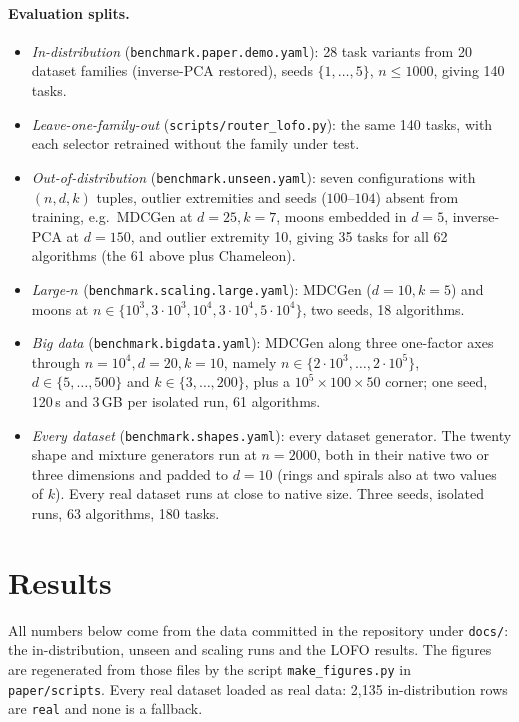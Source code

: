 \documentclass[11pt,a4paper]{article}
\newcommand{\code}[1]{\texttt{#1}}
\begin{document}
\paragraph{Evaluation splits.}
\begin{itemize}
  \item \emph{In-distribution} (\code{benchmark.paper.demo.yaml}): 28 task
  variants from 20 dataset families (inverse-PCA restored), seeds
  $\{1,\dots,5\}$, $n \le 1000$, giving 140 tasks.
  \item \emph{Leave-one-family-out} (\code{scripts/router\_lofo.py}): the same
  140 tasks, with each selector retrained without the family under test.
  \item \emph{Out-of-distribution} (\code{benchmark.unseen.yaml}): seven
  configurations with $(n, d, k)$ tuples, outlier extremities and seeds
  ($100$--$104$) absent from training, e.g.\ MDCGen at $d{=}25, k{=}7$, moons
  embedded in $d{=}5$, inverse-PCA at $d{=}150$, and outlier extremity 10,
  giving 35 tasks for all 62 algorithms (the 61 above plus Chameleon).
  \item \emph{Large-$n$} (\code{benchmark.scaling.large.yaml}): MDCGen
  ($d{=}10, k{=}5$) and moons at $n \in \{10^3, 3\cdot10^3, 10^4,
  3\cdot10^4, 5\cdot10^4\}$, two seeds, 18 algorithms.
  \item \emph{Big data} (\code{benchmark.bigdata.yaml}): MDCGen along three
  one-factor axes through $n{=}10^4, d{=}20, k{=}10$, namely
  $n \in \{2\cdot10^3, \dots, 2\cdot10^5\}$, $d \in \{5, \dots, 500\}$ and
  $k \in \{3, \dots, 200\}$, plus a $10^5 \times 100 \times 50$ corner; one
  seed, 120\,s and 3\,GB per isolated run, 61 algorithms.
  \item \emph{Every dataset} (\code{benchmark.shapes.yaml}): every dataset
  generator. The twenty shape and mixture generators run at $n = 2000$, both
  in their native two or three dimensions and padded to $d = 10$ (rings and
  spirals also at two values of $k$). Every real dataset runs at close to
  native size. Three seeds, isolated runs, 63 algorithms, 180 tasks.
\end{itemize}

\section{Results}\label{sec:results}

All numbers below come from the data committed in the repository
under \code{docs/}: the in-distribution, unseen and scaling runs and the
LOFO results. The figures are regenerated from those
files by the script \code{make\_figures.py} in \code{paper/scripts}. Every real
dataset loaded as real data: 2{,}135 in-distribution rows are \code{real}
and none is a fallback.
\end{document}
